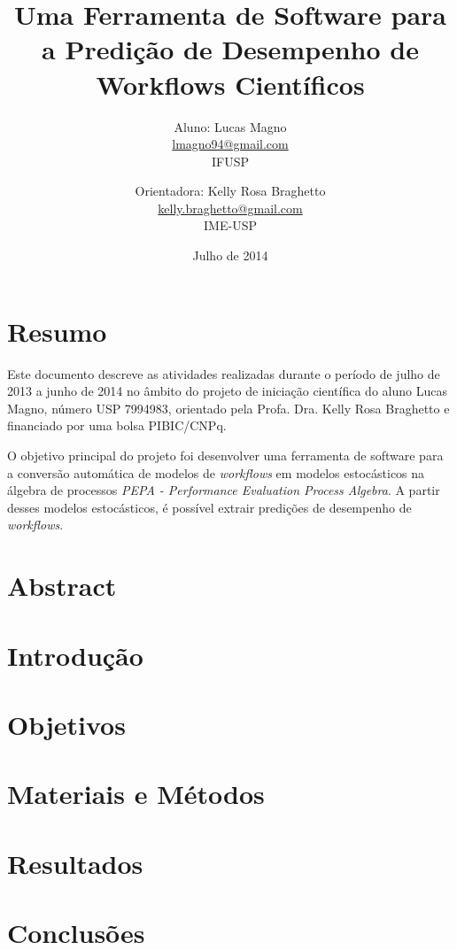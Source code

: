 \documentclass[a4paper,11pt]{article}
\date{Julho de 2014}
\title{
	Uma Ferramenta de Software para a Predição de Desempenho de Workflows Científicos
}
\author{
  Aluno: Lucas Magno \\
	\href{mailto:lmagno94@gmail.com}{lmagno94@gmail.com} \\
	IFUSP \\
	\and
    Orientadora: Kelly Rosa Braghetto\\
	\href{mailto:kelly.braghetto@gmail.com}{kelly.braghetto@gmail.com} \\
	IME-USP \\
}
\begin{document}
  \maketitle
  \section*{Resumo}
	Este documento descreve as atividades realizadas durante o período de julho de 2013 a junho de 2014 no âmbito do projeto de iniciação científica do aluno Lucas Magno, número USP 7994983, orientado pela Profa. Dra. Kelly Rosa Braghetto e financiado por uma bolsa PIBIC/CNPq.

	O objetivo principal do projeto foi desenvolver uma ferramenta de software para a conversão automática de modelos de \emph{workflows} em modelos estocásticos na álgebra de processos \emph{PEPA - Performance Evaluation Process Algebra}. A partir desses modelos estocásticos, é possível extrair predições de desempenho de \emph{workflows}.
  \section*{Abstract}

  \newpage
  \section{Introdução}
  \section{Objetivos}
  \section{Materiais e Métodos}
  \section{Resultados}
  \section{Conclusões}


  
  
\end{document}
